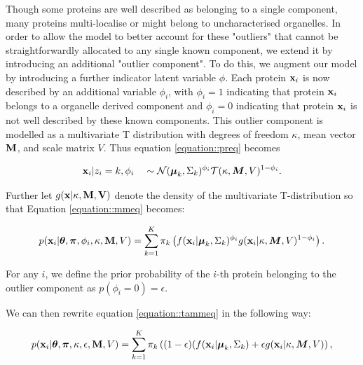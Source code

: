 \documentclass[12pt,english]{article}\usepackage[]{graphicx}\usepackage[]{color}
\begin{document}
Though some proteins are well described as belonging to a single
component, many proteins multi-localise or might belong to
uncharacterised organelles. In order to allow the model to better
account for these "outliers" that cannot be straightforwardly
allocated to any single known component, we extend it by introducing
an additional "outlier component". To do this, we augment our model by
introducing a further indicator latent variable $\phi$. Each protein
${\bf x}_i$ is now described by an additional variable $\phi_i$, with
$\phi_i = 1$ indicating that protein ${\bf x}_i$ belongs to a
organelle derived component and $\phi_i = 0$ indicating that protein
${\bf x}_i$ is not well described by these known components. This
outlier component is modelled as a multivariate T distribution with
degrees of freedom $\kappa$, mean vector $\bf{M}$, and scale matrix
$V$. Thus equation \eqref{equation::preq} becomes

\begin{align}
{\bf x}_i | z_i = k, \phi_i \quad \sim \mathcal{N}(\boldsymbol{\mu}_k, \Sigma_k)^{\phi_i}\mathcal{T}(\kappa, \boldsymbol{M}, V)^{1 - \phi_i }.
\end{align}

Further let $g({\bf x | \kappa, \bf{M}, V} )$ denote the density of
the multivariate T-distribution so that Equation
\eqref{equation::mmeq} becomes:

\begin{equation} \label{equation::tammeq}
  \begin{split}
    p({\bf x}_i| \boldsymbol{\theta}, \boldsymbol{\pi} ,\phi_i, \kappa, {\bf M}, V) &=  \sum_{k=1}^{K}\pi_k\left(f({\bf x}_i|\boldsymbol{\mu}_k, \Sigma_k)^{\phi_i}g({\bf x}_i|\kappa, \boldsymbol{M}, V)^{1 - \phi_i }\right).\\
  \end{split}
\end{equation}

For any $i$, we define the prior probability of the $i$-th protein
belonging to the outlier component as $p(\phi_i = 0) = \epsilon$.

We can then rewrite equation \eqref{equation::tammeq} in the following way:

\begin{equation}\label{equation::tammepseq}
  \begin{split}
    p({\bf x}_i| \boldsymbol{\theta}, \boldsymbol{\pi} , \kappa, \epsilon, {\bf M}, V) &=  \sum_{k=1}^{K}\pi_k\left((1-\epsilon)(f({\bf x}_i |\boldsymbol{\mu}_k, \Sigma_k) + \epsilon g({\bf x}_i|\kappa, \boldsymbol{M}, V)\right),\\
  \end{split}
\end{equation}
\end{document}
